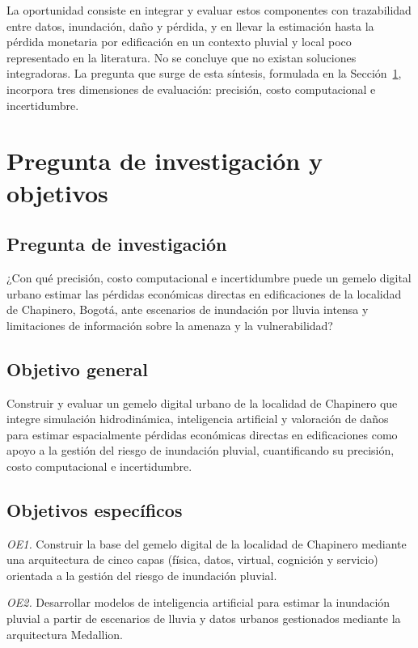 \documentclass[journal]{IEEEtran}
\begin{document}
La oportunidad consiste en integrar y evaluar estos componentes con trazabilidad entre datos, inundación, daño y pérdida, y en llevar la estimación hasta la pérdida monetaria por edificación en un contexto pluvial y local poco representado en la literatura. No se concluye que no existan soluciones integradoras. La pregunta que surge de esta síntesis, formulada en la Sección~\ref{sec:pregunta}, incorpora tres dimensiones de evaluación: precisión, costo computacional e incertidumbre.

\section{Pregunta de investigación y objetivos}
\label{sec:pregunta}

\subsection{Pregunta de investigación}

¿Con qué precisión, costo computacional e incertidumbre puede un gemelo digital urbano estimar las pérdidas económicas directas en edificaciones de la localidad de Chapinero, Bogotá, ante escenarios de inundación por lluvia intensa y limitaciones de información sobre la amenaza y la vulnerabilidad?

\subsection{Objetivo general}

Construir y evaluar un gemelo digital urbano de la localidad de Chapinero que integre simulación hidrodinámica, inteligencia artificial y valoración de daños para estimar espacialmente pérdidas económicas directas en edificaciones como apoyo a la gestión del riesgo de inundación pluvial, cuantificando su precisión, costo computacional e incertidumbre.

\subsection{Objetivos específicos}

\textit{OE1.} Construir la base del gemelo digital de la localidad de Chapinero mediante una arquitectura de cinco capas (física, datos, virtual, cognición y servicio) orientada a la gestión del riesgo de inundación pluvial.

\textit{OE2.} Desarrollar modelos de inteligencia artificial para estimar la inundación pluvial a partir de escenarios de lluvia y datos urbanos gestionados mediante la arquitectura Medallion.
\end{document}
